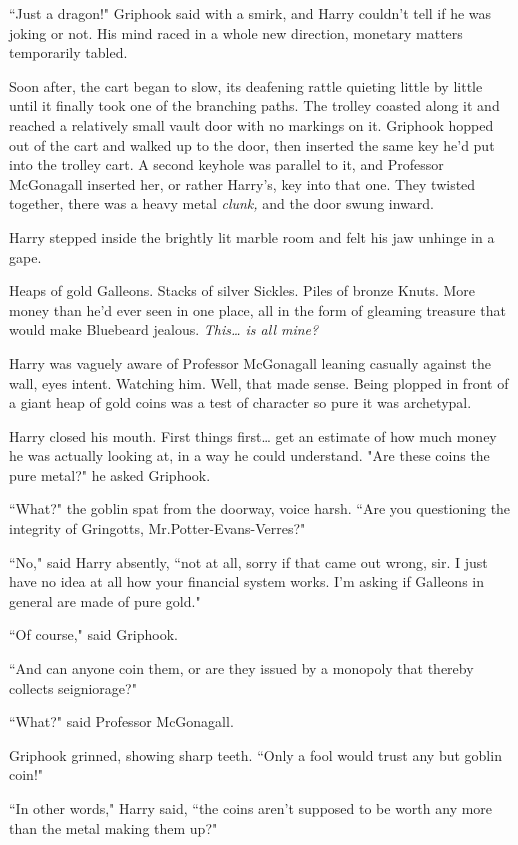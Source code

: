 ``Just a dragon!" Griphook said with a smirk, and Harry couldn't tell if he was joking or not. His mind raced in a whole new direction, monetary matters temporarily tabled.

Soon after, the cart began to slow, its deafening rattle quieting little by little until it finally took one of the branching paths. The trolley coasted along it and reached a relatively small vault door with no markings on it. Griphook hopped out of the cart and walked up to the door, then inserted the same key he'd put into the trolley cart. A second keyhole was parallel to it, and Professor McGonagall inserted her, or rather Harry's, key into that one. They twisted together, there was a heavy metal \emph{clunk,} and the door swung inward.

Harry stepped inside the brightly lit marble room and felt his jaw unhinge in a gape.

Heaps of gold Galleons. Stacks of silver Sickles. Piles of bronze Knuts. More money than he'd ever seen in one place, all in the form of gleaming treasure that would make Bluebeard jealous. \emph{This{\ldots} is all mine?}

Harry was vaguely aware of Professor McGonagall leaning casually against the wall, eyes intent. Watching him. Well, that made sense. Being plopped in front of a giant heap of gold coins was a test of character so pure it was archetypal.

Harry closed his mouth. First things first{\ldots} get an estimate of how much money he was actually looking at, in a way he could understand. "Are these coins the pure metal?" he asked Griphook.

``What?" the goblin spat from the doorway, voice harsh. ``Are you questioning the integrity of Gringotts, Mr.\?Potter-Evans-Verres?"

``No," said Harry absently, ``not at all, sorry if that came out wrong, sir. I just have no idea at all how your financial system works. I'm asking if Galleons in general are made of pure gold."

``Of course," said Griphook.

``And can anyone coin them, or are they issued by a monopoly that thereby collects seigniorage?"

``What?" said Professor McGonagall.

Griphook grinned, showing sharp teeth. ``Only a fool would trust any but goblin coin!"

``In other words," Harry said, ``the coins aren't supposed to be worth any more than the metal making them up?"

